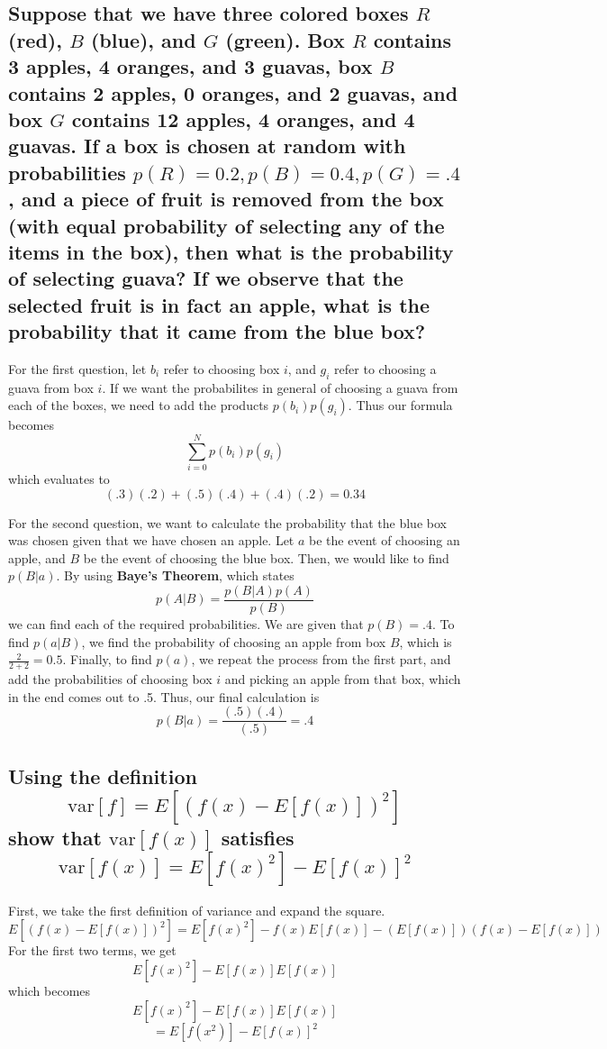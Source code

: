 \documentclass{article}
\begin{document}
		\subsection{Suppose that we have three colored boxes $R$ (red), $B$ (blue),
				and $G$ (green). Box $R$ contains 3 apples, 4 oranges, and 3 guavas,
				box $B$ contains 2 apples, 0 oranges, and 2 guavas, and box $G$ contains
				12 apples, 4 oranges, and 4 guavas. If a box is chosen at random with 
				probabilities $p(R)=0.2,p(B)=0.4,p(G)=.4$, and a piece of fruit is removed
				from the box (with equal probability of selecting any of the items in the box),
				then what is the probability of selecting guava? If we observe that the selected
				fruit is in fact an apple, what is the probability that it came from the blue box?}

		For the first question, let $b_{i}$ refer to choosing box $i$, and $g_{i}$ refer 
		to choosing a guava from box $i$. If we want the probabilites in general of choosing
		a guava from each of the boxes, we need to add the products $p(b_{i})p(g_{i})$. Thus 
		our formula becomes 
				\[ \sum_{i=0}^{N}p(b_{i})p(g_{i})\]
		which evaluates to 
				\[(.3)(.2) + (.5)(.4) + (.4)(.2) = 0.34\]
		
		For the second question, we want to calculate the probability that the blue box was chosen
		given that we have chosen an apple. Let $a$ be the event of choosing an apple, and $B$ be
		the event of choosing the blue box. Then, we would like to find $p(B|a)$. By using
		\textbf{Baye's Theorem}, which states
		\[ p(A|B) = \frac{p(B|A)p(A)}{p(B)}\]
		we can find each of the required probabilities. We are given that $p(B) = .4$. To find
		$p(a|B)$, we find the probability of choosing an apple from box $B$, which is 
		$\frac{2}{2+2} = 0.5$. Finally, to find $p(a)$, we repeat the process from the first part,
		and add the probabilities of choosing box $i$ and picking an apple from that box, which in the
		end comes out to .5. Thus, our final calculation is 
				\[ p(B|a) = \frac{(.5)(.4)}{(.5)} = .4\]


		\subsection{Using the definition \[\textrm{var}[f] = E[(f(x) - E[f(x)])^{2}] \]
		 show that $\textrm{var}[f(x)]$ satisfies
		\[\textrm{var}[f(x)] = E[f(x)^{2}] - E[f(x)]^{2}\]}
		
		First, we take the first definition of variance and expand the square.
		\[ E[(f(x) - E[f(x)])^{2}] = E[f(x)^{2}] - f(x)E[f(x)] - (E[f(x)])(f(x) - E[f(x)])\]
		For the first two terms, we get
		\begin{equation}
				E[f(x)^{2}] - E[f(x)]E[f(x)]
			\label{eq:1}
		\end{equation}
		which becomes
		\begin{equation}
			\label{eq:2}
			 E[f(x)^{2}] - E[f(x)]E[f(x)]
		\end{equation}
		\begin{equation}
				\label{eq:3}
			 = E[f(x^{2})] - E[f(x)]^{2}
		\end{equation}
\end{document}
